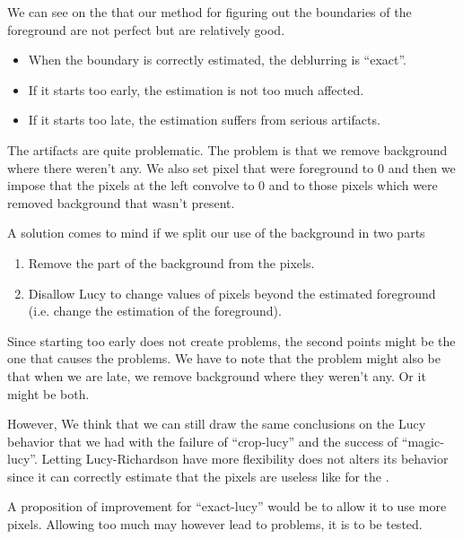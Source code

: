 We can see on the 
that our method for figuring out the boundaries of the
foreground are not perfect but are relatively good.
\begin{itemize}
  \item When the boundary is correctly estimated,
    the deblurring is ``exact''.
  \item If it starts too early, the estimation is not too much affected.
  \item If it starts too late, the estimation suffers from serious artifacts.
\end{itemize}
The artifacts are quite problematic.
The problem is that we remove background where there weren't any.
We also set pixel that were foreground to 0 and then
we impose that the pixels at the left convolve to 0 and to
those pixels which were removed background that wasn't present.

A solution comes to mind if we split our use of the background
in two parts
\begin{enumerate}
  \item Remove the part of the background from the pixels.
  \item Disallow Lucy to change values of pixels beyond the estimated foreground (i.e. change the estimation of the foreground).
\end{enumerate}
Since starting too early does not create problems,
the second points might be the one that causes the problems.
We have to note that the problem might also be that
when we are late, we remove background where they weren't any.
Or it might be both.

However, We think that
we can still draw the same conclusions on the Lucy behavior
that we had with
the failure of ``crop-lucy'' and the success of
``magic-lucy''.
Letting Lucy-Richardson have more flexibility does not
alters its behavior since it can correctly estimate that the
pixels are useless like for the .

A proposition of improvement for ``exact-lucy'' would be
to allow it to use more pixels.
Allowing too much may however lead to problems,
it is to be tested.
